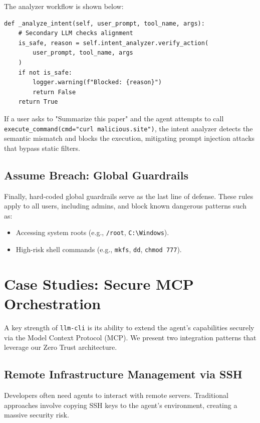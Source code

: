 \documentclass[conference]{IEEEtran}
\begin{document}
The analyzer workflow is shown below:

\begin{lstlisting}[caption={Intent Analysis Flow}, label={lst:intent}]
def _analyze_intent(self, user_prompt, tool_name, args):
    # Secondary LLM checks alignment
    is_safe, reason = self.intent_analyzer.verify_action(
        user_prompt, tool_name, args
    )
    if not is_safe:
        logger.warning(f"Blocked: {reason}")
        return False
    return True
\end{lstlisting}

If a user asks to "Summarize this paper" and the agent attempts to call \texttt{execute\_command(cmd="curl malicious.site")}, the intent analyzer detects the semantic mismatch and blocks the execution, mitigating prompt injection attacks that bypass static filters.

\subsection{Assume Breach: Global Guardrails}
Finally, hard-coded global guardrails serve as the last line of defense. These rules apply to all users, including admins, and block known dangerous patterns such as:
\begin{itemize}
    \item Accessing system roots (e.g., \texttt{/root}, \texttt{C:\textbackslash Windows}).
    \item High-risk shell commands (e.g., \texttt{mkfs}, \texttt{dd}, \texttt{chmod 777}).
\end{itemize}

\section{Case Studies: Secure MCP Orchestration}

A key strength of \texttt{llm-cli} is its ability to extend the agent's capabilities securely via the Model Context Protocol (MCP). We present two integration patterns that leverage our Zero Trust architecture.

\subsection{Remote Infrastructure Management via SSH}
Developers often need agents to interact with remote servers. Traditional approaches involve copying SSH keys to the agent's environment, creating a massive security risk.
\end{document}
